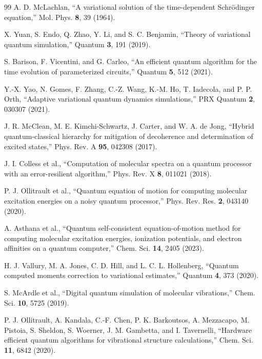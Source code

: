 \documentclass[
  reprint,
  amsmath,
  amssymb,
  aps,
  pra,
  nofootinbib,
  superscriptaddress,
  floatfix
]{revtex4-2}
\begin{document}
\begin{thebibliography}{99}
A. D. McLachlan,
``A variational solution of the time-dependent Schr\"odinger equation,''
Mol. Phys. \textbf{8}, 39 (1964).

X. Yuan, S. Endo, Q. Zhao, Y. Li, and S. C. Benjamin,
``Theory of variational quantum simulation,''
Quantum \textbf{3}, 191 (2019).

S. Barison, F. Vicentini, and G. Carleo,
``An efficient quantum algorithm for the time evolution of parameterized circuits,''
Quantum \textbf{5}, 512 (2021).

Y.-X. Yao, N. Gomes, F. Zhang, C.-Z. Wang, K.-M. Ho, T. Iadecola, and P. P. Orth,
``Adaptive variational quantum dynamics simulations,''
PRX Quantum \textbf{2}, 030307 (2021).

J. R. McClean, M. E. Kimchi-Schwartz, J. Carter, and W. A. de Jong,
``Hybrid quantum-classical hierarchy for mitigation of decoherence and determination of excited states,''
Phys. Rev. A \textbf{95}, 042308 (2017).

J. I. Colless et al.,
``Computation of molecular spectra on a quantum processor with an error-resilient algorithm,''
Phys. Rev. X \textbf{8}, 011021 (2018).

P. J. Ollitrault et al.,
``Quantum equation of motion for computing molecular excitation energies on a noisy quantum processor,''
Phys. Rev. Res. \textbf{2}, 043140 (2020).

A. Asthana et al.,
``Quantum self-consistent equation-of-motion method for computing molecular excitation energies, ionization potentials, and electron affinities on a quantum computer,''
Chem. Sci. \textbf{14}, 2405 (2023).

H. J. Vallury, M. A. Jones, C. D. Hill, and L. C. L. Hollenberg,
``Quantum computed moments correction to variational estimates,''
Quantum \textbf{4}, 373 (2020).

S. McArdle et al.,
``Digital quantum simulation of molecular vibrations,''
Chem. Sci. \textbf{10}, 5725 (2019).

P. J. Ollitrault, A. Kandala, C.-F. Chen, P. K. Barkoutsos, A. Mezzacapo, M. Pistoia, S. Sheldon, S. Woerner, J. M. Gambetta, and I. Tavernelli,
``Hardware efficient quantum algorithms for vibrational structure calculations,''
Chem. Sci. \textbf{11}, 6842 (2020).


\end{thebibliography}
\end{document}
